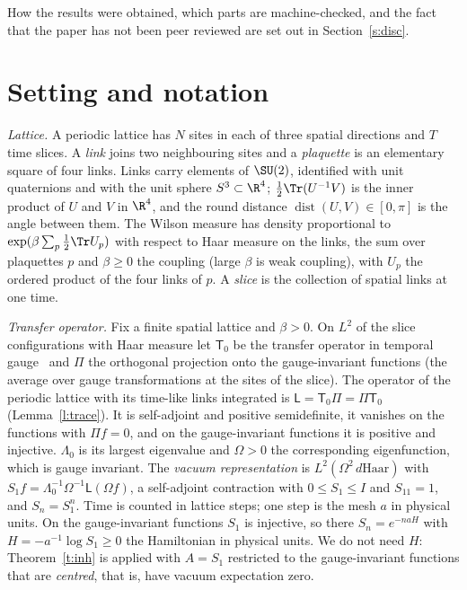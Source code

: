 How the results were obtained, which parts are machine-checked, and the fact that the paper has not been
peer reviewed are set out in Section~\ref{s:disc}.


\section{Setting and notation}\label{s:set}
\emph{Lattice.} A periodic lattice has $N$ sites in each of three spatial directions and $T$ time slices.
A \emph{link} joins two neighbouring sites and a \emph{plaquette} is an elementary square of four links.
Links carry elements of $\SU(2)$, identified with unit quaternions and with the unit sphere $S^3\subset\R^4$;
$\tfrac12\Tr(U^{-1}V)$ is the inner product of $U$ and $V$ in $\R^4$, and the round distance
$\operatorname{dist}(U,V)\in[0,\pi]$ is the angle between them. The Wilson measure has density proportional
to $\exp(\beta\sum_p\tfrac12\Tr U_p)$ with respect to Haar measure on the links, the sum over plaquettes $p$ and $\beta\ge0$ the coupling
(large $\beta$ is weak coupling),
with $U_p$ the ordered product of the four links of $p$. A \emph{slice} is the collection of spatial links at
one time.

\emph{Transfer operator.} Fix a finite spatial lattice and $\beta>0$. On $L^2$ of the slice configurations
with Haar measure let $\mathsf T_0$ be the transfer operator in temporal gauge~\cite{Lu77,OS78} and $\Pi$ the
orthogonal projection onto the gauge-invariant functions (the average over gauge transformations at the
sites of the slice). The operator of the periodic lattice with its time-like links integrated is
$\mathsf L=\mathsf T_0\Pi=\Pi\mathsf T_0$ (Lemma~\ref{l:trace}). It is self-adjoint and positive semidefinite, it
vanishes on the functions with $\Pi f=0$, and on the gauge-invariant functions it is positive and injective.
$\Lambda_0$ is its largest eigenvalue and $\Omega>0$ the corresponding eigenfunction, which is gauge invariant.
The \emph{vacuum representation} is $L^2(\Omega^2\,d\mathrm{Haar})$ with
$S_1f=\Lambda_0^{-1}\Omega^{-1}\mathsf L(\Omega f)$, a self-adjoint contraction with $0\le S_1\le I$ and $S_11=1$,
and $S_n=S_1^n$. Time is counted in lattice steps; one step is the mesh $a$ in physical units. On the
gauge-invariant functions $S_1$ is injective, so there $S_n=e^{-naH}$ with $H=-a^{-1}\log S_1\ge0$ the Hamiltonian in physical
units. We do not need $H$: Theorem~\ref{t:inh} is applied with $A=S_1$ restricted to the
gauge-invariant functions that are \emph{centred}, that is, have vacuum expectation zero.

